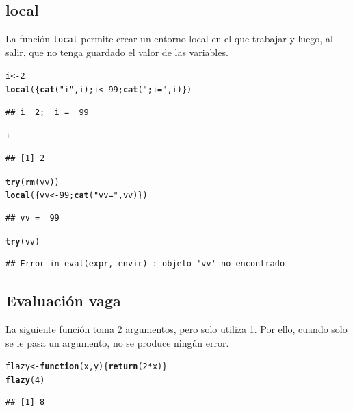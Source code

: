\documentclass{config/apuntes}\usepackage[]{graphicx}\usepackage[]{xcolor}
\makeatletter
\newcommand{\hlnum}[1]{\textcolor[rgb]{0.686,0.059,0.569}{#1}}%
\newcommand{\hlsng}[1]{\textcolor[rgb]{0.192,0.494,0.8}{#1}}%
\newcommand{\hlopt}[1]{\textcolor[rgb]{0,0,0}{#1}}%
\newcommand{\hldef}[1]{\textcolor[rgb]{0.345,0.345,0.345}{#1}}%
\newcommand{\hlkwa}[1]{\textcolor[rgb]{0.161,0.373,0.58}{\textbf{#1}}}%
\newcommand{\hlkwb}[1]{\textcolor[rgb]{0.69,0.353,0.396}{#1}}%
\newcommand{\hlkwc}[1]{\textcolor[rgb]{0.333,0.667,0.333}{#1}}%
\newcommand{\hlkwd}[1]{\textcolor[rgb]{0.737,0.353,0.396}{\textbf{#1}}}%
\newenvironment{kframe}{%
 \def\at@end@of@kframe{}%
 \ifinner\ifhmode%
  \def\at@end@of@kframe{\end{minipage}}%
  \begin{minipage}{\columnwidth}%
 \fi\fi%
 \def\FrameCommand##1{\hskip\@totalleftmargin \hskip-\fboxsep
 \colorbox{shadecolor}{##1}\hskip-\fboxsep
     \hskip-\linewidth \hskip-\@totalleftmargin \hskip\columnwidth}%
 \MakeFramed {\advance\hsize-\width
   \@totalleftmargin\z@ \linewidth\hsize
   \@setminipage}}%
 {\par\unskip\endMakeFramed%
 \at@end@of@kframe}
\newenvironment{knitrout}{}{} %
\newcommand{\code}[1]{\texttt{#1}}
\makeatother
\begin{document}
\subsection{local}
La función \code{local} permite crear un entorno local en el que trabajar y luego, al salir, que no tenga guardado el valor de las variables.

\begin{knitrout}
\color{fgcolor}\begin{kframe}
\begin{alltt}
\hldef{i} \hlkwb{<-} \hlnum{2}
\hlkwd{local}\hldef{(\{}\hlkwd{cat}\hldef{(}\hlsng{"i "}\hldef{, i); i} \hlkwb{<-} \hlnum{99}\hldef{;} \hlkwd{cat}\hldef{(}\hlsng{";  i = "}\hldef{, i)\})}
\end{alltt}
\begin{verbatim}
## i  2;  i =  99
\end{verbatim}
\begin{alltt}
\hldef{i}
\end{alltt}
\begin{verbatim}
## [1] 2
\end{verbatim}
\begin{alltt}
\hlkwd{try}\hldef{(}\hlkwd{rm}\hldef{(vv))}
\hlkwd{local}\hldef{(\{vv} \hlkwb{<-} \hlnum{99}\hldef{;} \hlkwd{cat}\hldef{(}\hlsng{"vv = "}\hldef{, vv)\})}
\end{alltt}
\begin{verbatim}
## vv =  99
\end{verbatim}
\begin{alltt}
\hlkwd{try}\hldef{(vv)}
\end{alltt}
\begin{verbatim}
## Error in eval(expr, envir) : objeto 'vv' no encontrado
\end{verbatim}
\end{kframe}
\end{knitrout}

\subsection{Evaluación vaga}
La siguiente función toma 2 argumentos, pero solo utiliza 1. Por ello, cuando solo se le pasa un argumento, no se produce ningún error.
\begin{knitrout}
\color{fgcolor}\begin{kframe}
\begin{alltt}
\hldef{flazy} \hlkwb{<-} \hlkwa{function}\hldef{(}\hlkwc{x}\hldef{,} \hlkwc{y}\hldef{) \{}\hlkwd{return}\hldef{(}\hlnum{2} \hlopt{*} \hldef{x)\}}
\hlkwd{flazy}\hldef{(}\hlnum{4}\hldef{)}
\end{alltt}
\begin{verbatim}
## [1] 8
\end{verbatim}
\end{kframe}
\end{knitrout}
\end{document}

